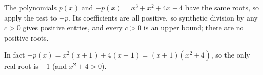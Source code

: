 The polynomials $p(x)$ and $-p(x)=x^3+x^2+4x+4$ have the same roots, so apply the test to $-p$. Its coefficients are all positive, so synthetic division by any $c>0$ gives positive entries, and every $c>0$ is an upper bound; there are no positive roots.

In fact $-p(x)=x^2(x+1)+4(x+1)=(x+1)(x^2+4)$, so the only real root is $\boxed{-1}$ (and $x^2+4>0$).
